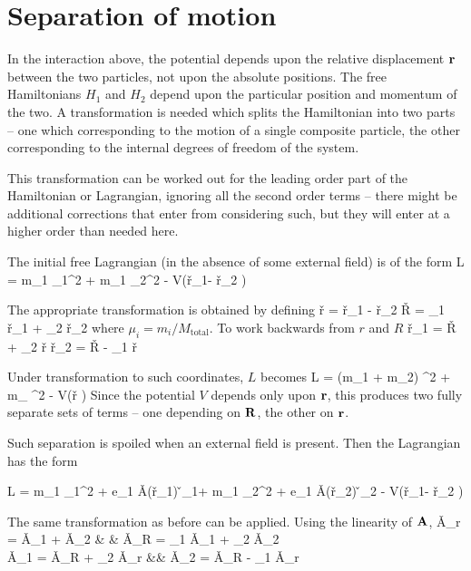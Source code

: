  
\section{Separation of motion}
In the interaction above, the potential depends upon the relative displacement $\mathbf{r}$ between the two particles, not upon the absolute positions.  The free Hamiltonians $H_1$ and $H_2$ depend upon the particular position and momentum of the two.  A transformation is needed which splits the Hamiltonian into two parts -- one which corresponding to the motion of a single composite particle, the other corresponding to the internal degrees of freedom of the system.

This transformation can be worked out for the leading order part of the Hamiltonian or Lagrangian, ignoring all the second order terms -- there might be additional corrections that enter from considering such, but they will enter at a higher order than needed here.

The initial free Lagrangian (in the absence of some external field) is of the form
\beq
	L =  m_1 _1^2   +  m_1 _2^2 - V(\v{r_1}- \v{r_2} )	 
\eeq

The appropriate transformation is obtained by defining
\beq
	\v{r} = \v{r}_1 - \v{r}_2  \hspace{4em}   \v{R} = \mu_1 \v{r}_1 + \mu_2 \v{r}_2
\eeq 
where $\mu_i = m_i / M_\text{total}$. 
To work backwards from $r$ and $R$
\beq
	\v{r}_1 = \v{R} + \mu_2 \v{r}  \hspace{4em} \v{r}_2 = \v{R} - \mu_1 \v{r}\\
\eeq

Under transformation to such coordinates, $L$ becomes
\beq
		L =  (m_1 + m_2) ^2   +  m_ ^2 - V(\v{r} )	 
\eeq
Since the potential $V$ depends only upon $\mathbf{r}$, this produces two fully separate sets of terms -- one depending on $\mathbf{R}$, the other on $\mathbf{r}$.

Such separation is spoiled when an external field is present.  Then the Lagrangian has the form

\beq
	L =  m_1 _1^2  + e_1 \v{A}(\v{r}_1) \cdot \v{}_1+  m_1 _2^2 +  e_1 \v{A}(\v{r}_2) \cdot \v{}_2  - V(\v{r_1}- \v{r_2} )	 
\eeq

The same transformation as before can be applied.  Using the linearity of $\mathbf{A}$, 
\beqa
	\v{A}_r = \v{A}_1 + \v{A}_2 & \hspace{4em}& \v{A}_R = \mu_1 \v{A}_1 + \mu_2 \v{A}_2	\\
		\v{A}_1 = \v{A}_R + \mu_2 \v{A}_r  &\hspace{4em}& \v{A}_2 = \v{A}_R - \mu_1 \v{A}_r
\eeqa

